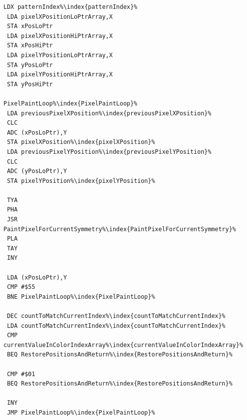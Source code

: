 \begin{minipage}[b]{0.33\linewidth}
\begin{lrbox}{\mybox}
\begin{lstlisting}[basicstyle=\ttfamily\tiny,escapechar=\%]
 LDX patternIndex%\index{patternIndex}%
 LDA pixelXPositionLoPtrArray,X
 STA xPosLoPtr
 LDA pixelXPositionHiPtrArray,X
 STA xPosHiPtr
 LDA pixelYPositionLoPtrArray,X
 STA yPosLoPtr
 LDA pixelYPositionHiPtrArray,X
 STA yPosHiPtr

PixelPaintLoop%\index{PixelPaintLoop}%
 LDA previousPixelXPosition%\index{previousPixelXPosition}%
 CLC
 ADC (xPosLoPtr),Y
 STA pixelXPosition%\index{pixelXPosition}%
 LDA previousPixelYPosition%\index{previousPixelYPosition}%
 CLC
 ADC (yPosLoPtr),Y
 STA pixelYPosition%\index{pixelYPosition}%

 TYA
 PHA
 JSR PaintPixelForCurrentSymmetry%\index{PaintPixelForCurrentSymmetry}%
 PLA
 TAY
 INY

 LDA (xPosLoPtr),Y
 CMP #$55
 BNE PixelPaintLoop%\index{PixelPaintLoop}%

 DEC countToMatchCurrentIndex%\index{countToMatchCurrentIndex}%
 LDA countToMatchCurrentIndex%\index{countToMatchCurrentIndex}%
 CMP currentValueInColorIndexArray%\index{currentValueInColorIndexArray}%
 BEQ RestorePositionsAndReturn%\index{RestorePositionsAndReturn}%

 CMP #$01
 BEQ RestorePositionsAndReturn%\index{RestorePositionsAndReturn}%

 INY
 JMP PixelPaintLoop%\index{PixelPaintLoop}%
\end{lstlisting}
\end{lrbox}%
\scalebox{0.8}{\usebox{\mybox}}
\end{minipage}
\hspace{-0.1cm}
